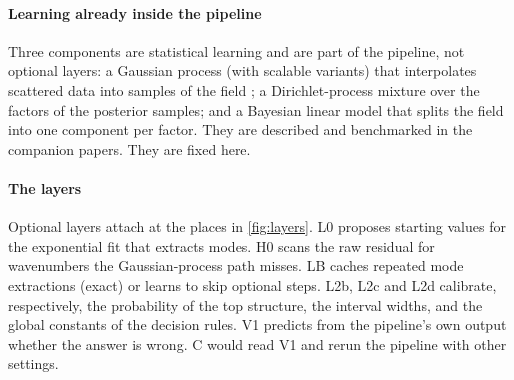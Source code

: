 \paragraph{Learning already inside the pipeline} Three components are statistical learning and are part of the pipeline,
not optional layers: a Gaussian process (with scalable variants) that interpolates scattered data into samples of the field
\cite{RasWil06}; a Dirichlet-process mixture over the factors of the posterior samples; and a Bayesian linear model that
splits the field into one component per factor. They are described and benchmarked in the companion papers. They are
fixed here.

\paragraph{The layers} Optional layers attach at the places in \cref{fig:layers}. L0 proposes starting values for the
exponential fit that extracts modes. H0 scans the raw residual for wavenumbers the Gaussian-process path misses. LB caches
repeated mode extractions (exact) or learns to skip optional steps. L2b, L2c and L2d calibrate, respectively, the
probability of the top structure, the interval widths, and the global constants of the decision rules. V1 predicts from the
pipeline's own output whether the answer is wrong. C would read V1 and rerun the pipeline with other settings.



